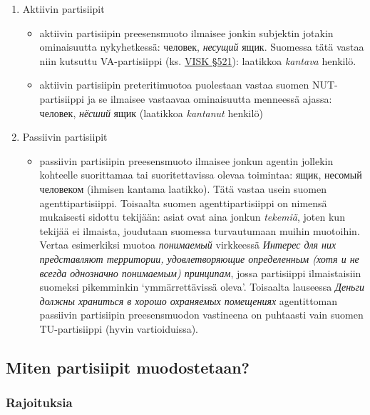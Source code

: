 \documentclass[]{scrreprt}
\providecommand{\tightlist}{%
  \setlength{\itemsep}{0pt}\setlength{\parskip}{0pt}}
\begin{document}
\begin{enumerate}
\def\labelenumi{\arabic{enumi}.}
\tightlist
\item
  Aktiivin partisiipit

  \begin{itemize}
  \tightlist
  \item
    aktiivin partisiipin preesensmuoto ilmaisee jonkin subjektin jotakin
    ominaisuutta nykyhetkessä: человек, \emph{несущий} ящик. Suomessa
    tätä vastaa niin kutsuttu VA-partisiippi (ks.
    \href{http://scripta.kotus.fi/visk/sisallys.php?p=521}{VISK §521}):
    laatikkoa \emph{kantava} henkilö.
  \item
    aktiivin partisiipin preteritimuotoa puolestaan vastaa suomen
    NUT-partisiippi ja se ilmaisee vastaavaa ominaisuutta menneessä
    ajassa: человек, \emph{нёсший} ящик (laatikkoa \emph{kantanut}
    henkilö)
  \end{itemize}
\item
  Passiivin partisiipit

  \begin{itemize}
  \tightlist
  \item
    passiivin partisiipin preesensmuoto ilmaisee jonkun agentin jollekin
    kohteelle suorittamaa tai suoritettavissa olevaa toimintaa: ящик,
    несомый человеком (ihmisen kantama laatikko). Tätä vastaa usein
    suomen agenttipartisiippi. Toisaalta suomen agenttipartisiippi on
    nimensä mukaisesti sidottu tekijään: asiat ovat aina jonkun
    \emph{tekemiä}, joten kun tekijää ei ilmaista, joudutaan suomessa
    turvautumaan muihin muotoihin. Vertaa esimerkiksi muotoa
    \emph{понимаемый} virkkeessä \emph{Интерес для них представляют
    территории, удовлетворяющие определенным (хотя и не всегда
    однозначно понимаемым) принципам}, jossa partisiippi ilmaistaisiin
    suomeksi pikemminkin `ymmärrettävissä oleva'. Toisaalta lauseessa
    \emph{Деньги должны храниться в хорошо охраняемых помещениях}
    agentittoman passiivin partisiipin preesensmuodon vastineena on
    puhtaasti vain suomen TU-partisiippi (hyvin vartioiduissa).
  \end{itemize}
\end{enumerate}

\subsection{Miten partisiipit
muodostetaan?}\label{miten-partisiipit-muodostetaan}

\subsubsection{Rajoituksia}\label{rajoituksia}
\end{document}
